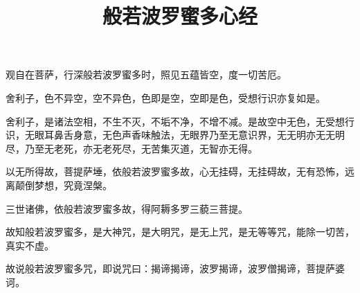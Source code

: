 \documentclass[a4paper]{article}
\title{般若波罗蜜多心经}
\author{}
\date{}
\begin{document}
\maketitle
\vspace{-5em}

\fontsize{14pt}{\baselineskip}\selectfont%

观自在菩萨，行深般若波罗蜜多时，照见五蕴皆空，度一切苦厄。


舍利子，色不异空，空不异色，色即是空，空即是色，受想行识亦复如是。


舍利子，是诸法空相，不生不灭，不垢不净，不增不减。是故空中无色，无受想行识，无眼耳鼻舌身意，无色声香味触法，无眼界乃至无意识界，无无明亦无无明尽，乃至无老死，亦无老死尽，无苦集灭道，无智亦无得。


以无所得故，菩提萨埵，依般若波罗蜜多故，心无挂碍，无挂碍故，无有恐怖，远离颠倒梦想，究竟涅槃。


三世诸佛，依般若波罗蜜多故，得阿耨多罗三藐三菩提。


故知般若波罗蜜多，是大神咒，是大明咒，是无上咒，是无等等咒，能除一切苦，真实不虚。


故说般若波罗蜜多咒，即说咒曰：揭谛揭谛，波罗揭谛，波罗僧揭谛，菩提萨婆诃。
\end{document}
